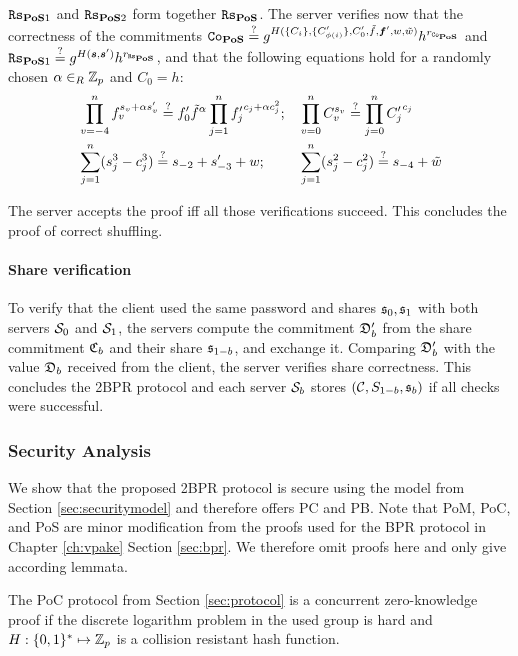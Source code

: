 \noindent
$\mathtt{Rs}_{\mathsf{\bf PoS}1}$ and $\mathtt{Rs}_{\mathsf{\bf PoS}2}$ form together $\mathtt{Rs}_{\mathsf{\bf PoS}}$.
The server verifies now that the correctness of the commitments
$\mathtt{Co}_\mathsf{\bf PoS} \stackrel{?}{=} g^{H(\{C_i\}, \{C'_{\phi(i)}\}, C'_0, \tilde{f}, \bm f', w, \tilde{w})} h^{r_{\mathtt{Co}_\mathsf{\bf PoS}}}$ and
$\mathtt{Rs}_{\mathsf{\bf PoS}1} \stackrel{?}{=} g^{H(\bm s, \bm s')} h^{r_{\mathtt{Rs}_\mathsf{\bf PoS}}}$,
and that the following equations hold for a randomly chosen $\alpha\in_R\mathbb{Z}_p$ and $C_0=h$:
\begin{align*}
  & \prod_{v=-4}^{n} f_v^{s_v+\alpha s'_v}  \stackrel{?}{=}  f'_0\tilde{f}^\alpha \prod_{j=1}^n {f'_j}^{c_j+\alpha c_j^2};
  &&  \prod_{v=0}^n C_v^{s_v}  \stackrel{?}{=}  \prod_{j=0}^n {C'_j}^{c_j} \\
  & \sum_{j=1}^n (s_j^3 - c_j^3)  \stackrel{?}{=}  s_{-2} + s'_{-3} + w;
  &&  \sum_{j=1}^n (s_j^2 - c_j^2)  \stackrel{?}{=}  s_{-4} + \tilde{w} 
\end{align*}

\noindent
The server accepts the proof iff all those verifications succeed.
This concludes the proof of correct shuffling.

\paragraph{Share verification}
To verify that the client used the same password \pwd and shares $\mathfrak{s}_0,\mathfrak{s}_1$ with both servers $\mathcal{S}_0$ and $\mathcal{S}_1$, the servers compute the commitment $\mathfrak{D}'_b$ from the share commitment $\mathfrak{C}_b$ and their share $\mathfrak{s}_{1-b}$, and exchange it.
Comparing $\mathfrak{D}'_b$ with the value $\mathfrak{D}_b$ received from the client, the server verifies share correctness.
This concludes the \ac{2BPR} protocol and each server $\mathcal{S}_b$ stores $(\mathcal{C},S_{1-b},\mathfrak{s}_b)$ if all checks were successful.

\subsubsection{Security Analysis}
We show that the proposed \ac{2BPR} protocol is secure using the model from Section \ref{sec:securitymodel} and therefore offers \acl{PC} and \acl{PB}.
Note that \ac{PoM}, \ac{PoC}, and \ac{PoS} are minor modification from the proofs used for the \ac{BPR} protocol in Chapter \ref{ch:vpake} Section \ref{sec:bpr}.
We therefore omit proofs here and only give according lemmata.

\begin{lemma}\label{lem:poc2}
  The \ac{PoC} protocol from Section \ref{sec:protocol} is a concurrent zero-knowledge proof if the discrete logarithm problem in the used group \GG is hard and $H:\{0,1\}^\ast\mapsto\mathbb{Z}_p$ is a collision resistant hash function.
\end{lemma}

